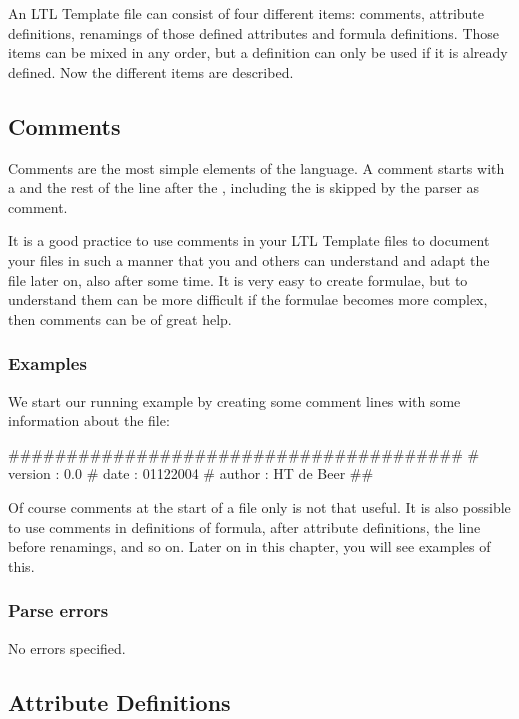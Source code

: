 An LTL Template file can consist of four different items: comments, attribute
definitions, renamings of those defined attributes and formula definitions.
Those items can be mixed in any order, but a definition can only be used if it
is already defined. Now the different items are described.

\subsection{Comments}
\label{language:comments}

Comments are the most simple elements of the language. A comment starts with a
\ltl{\#} and the rest of the line after the \ltl{\#}, including the \ltl{\#}
is skipped by the parser as comment.

It is a good practice to use comments in your LTL Template files to document your files in
such a manner that you and others can understand and adapt the file later on, also after
some time. It is very easy to create formulae, but to understand
them can be more difficult if the formulae becomes more complex, then comments can
be of great help.

\subsubsection{Examples}

We start our running example by creating some comment lines with some
information about the file:

\begin{ltlcode}
#######################################
# version  : 0.0
# date     : 01122004
# author   : HT de Beer
##
\end{ltlcode}

Of course comments at the start of a file only is not that useful. It is also
possible to use comments in definitions of formula, after attribute
definitions, the line before renamings, and so on. Later on in this chapter,
you will see examples of this.

\subsubsection{Parse errors}

    No errors specified.

\subsection{Attribute Definitions}
\label{language:attribute}

